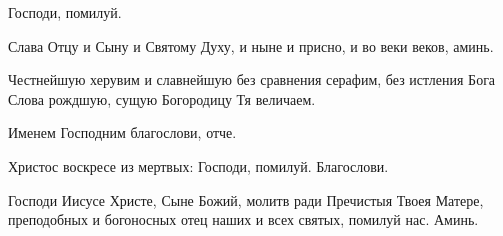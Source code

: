 \begin{mymulticols}
Господи, помилуй. 

Слава Отцу и Сыну и Святому Духу, и ныне и присно, и во веки веков, аминь. 

Честнейшую херувим и славнейшую без сравнения серафим, без истления Бога Слова рождшую, сущую Богородицу Тя величаем. 

Именем Господним благослови, отче. 

 \MolitvamiSviatyhOtecNashih 

Христос воскресе из мертвых:  
 Господи, помилуй. 
Благослови.

 Господи Иисусе Христе, Сыне Божий, молитв ради Пречистыя Твоея Матере, преподобных и богоносных отец наших и всех святых, помилуй нас. Аминь. 

\end{mymulticols}

\mychapterending
